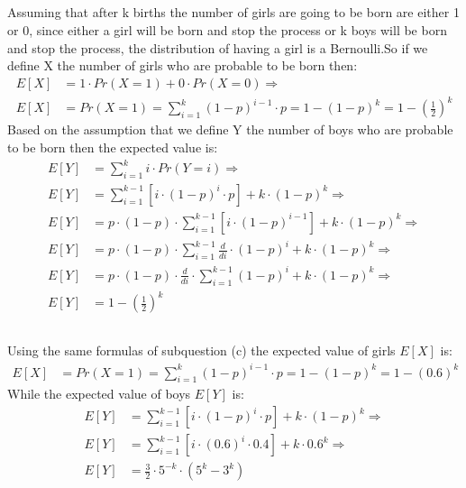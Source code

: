 \documentclass[11pt]{537homework}
\begin{document}
\subsection{}
Assuming that after k births the number of girls are going to be born are either 1 or 0, since either a girl will be born and stop the process or k boys will be born and stop the process, the distribution of having a girl is a Bernoulli.So if we define X the number of girls who are probable to be born then:\\
\begingroup
\allowdisplaybreaks
\begin{align*}
     E[X] &= 1\cdot Pr(X=1) + 0 \cdot Pr(X=0) \Longrightarrow \\ 
     E[X] &= Pr(X=1) =  \sum_{i=1}^{k} (1-p)^{i-1} \cdot p = 1 - (1-p)^k = 1 - (\frac{1}{2})^k
\end{align*}
\endgroup
Based on the assumption that we define Y the number of boys who are probable to be born then the expected value is: 
\begingroup
\allowdisplaybreaks
\begin{align*}
     E[Y] &= \sum_{i=1}^{k} i\cdot Pr(Y=i) \Longrightarrow \\ 
     E[Y] &= \sum_{i=1}^{k-1} [i\cdot (1-p)^i\cdot p] + k \cdot (1-p)^k \Longrightarrow \\ 
     E[Y] &= p \cdot (1-p) \cdot \sum_{i=1}^{k-1} [i\cdot (1-p)^{i-1}] +k \cdot (1-p)^k \Longrightarrow \\ 
     E[Y] &= p \cdot (1-p) \cdot \sum_{i=1}^{k-1} \frac{d}{di} \cdot (1-p)^i +k \cdot(1-p)^k \Longrightarrow \\ 
     E[Y] &= p \cdot (1-p) \cdot \frac{d}{di} \cdot \sum_{i=1}^{k-1} (1-p)^i +k \cdot(1-p)^k \Longrightarrow \\ 
     E[Y] &= 1 - (\frac{1}{2})^k 
\end{align*}
\endgroup

\subsection{}
Using the same formulas of subquestion (c) the expected value of girls $E[X]$ is:
\begingroup
\allowdisplaybreaks
\begin{align*}
     E[X] &= Pr(X=1) =  \sum_{i=1}^{k} (1-p)^{i-1} \cdot p = 1 - (1-p)^k = 1 - (0.6)^k
\end{align*}
\endgroup
While the expected value of boys $E[Y]$ is:
\begingroup
\allowdisplaybreaks
\begin{align*}
     E[Y] &= \sum_{i=1}^{k-1} [i\cdot (1-p)^i\cdot p] + k \cdot (1-p)^k \Longrightarrow \\ 
     E[Y] &= \sum_{i=1}^{k-1} [i\cdot (0.6)^i\cdot 0.4] + k \cdot 0.6^k \Longrightarrow \\ 
     E[Y] &= \frac{3}{2} \cdot 5^{-k}\cdot (5^k - 3^k)  
\end{align*}
\endgroup
\end{document}
